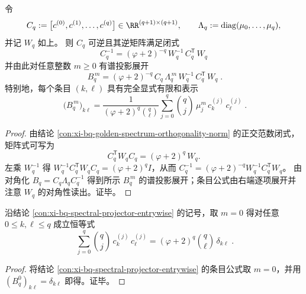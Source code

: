\begin{conclusion}\label{con:xi-bq-spectral-projector-entrywise}
令
\[
C_q:=\bigl[c^{(0)},c^{(1)},\dots,c^{(q)}\bigr]\in\RR^{(q+1)\times(q+1)},
\qquad
\Lambda_q:=\mathrm{diag}(\mu_0,\dots,\mu_q),
\]
并记 \(W_q\) 如上。
则 \(C_q\) 可逆且其逆矩阵满足闭式
\[
\boxed{\;
C_q^{-1}=(\varphi+2)^{-q}\,W_q^{-1}\,C_q^{\mathsf T}\,W_q\;}
\]
并由此对任意整数 \(m\ge 0\) 有谱投影展开
\[
\boxed{\;
B_q^{\,m}
=(\varphi+2)^{-q}\,C_q\,\Lambda_q^{\,m}\,W_q^{-1}\,C_q^{\mathsf T}\,W_q\; } .
\]
特别地，每个条目 \((k,\ell)\) 具有完全显式有限和表示
\[
\boxed{\;
\bigl(B_q^{\,m}\bigr)_{k\ell}
=\frac{1}{(\varphi+2)^{q}\binom{q}{\ell}}
\sum_{j=0}^{q}\binom{q}{j}\,\mu_j^{m}\,c^{(j)}_{k}\,c^{(j)}_{\ell}\; } .
\]
\end{conclusion}
\begin{proof}
由结论 \ref{con:xi-bq-golden-spectrum-orthogonality-norm} 的正交范数闭式，矩阵式可写为
\[
C_q^{\mathsf T}W_qC_q=(\varphi+2)^q\,W_q.
\]
左乘 \(W_q^{-1}\) 得 \(W_q^{-1}C_q^{\mathsf T}W_qC_q=(\varphi+2)^q I\)，从而
\(
C_q^{-1}=(\varphi+2)^{-q}W_q^{-1}C_q^{\mathsf T}W_q
\)。
由对角化 \(B_q=C_q\Lambda_qC_q^{-1}\) 得到所示 \(B_q^{\,m}\) 的谱投影展开；条目公式由右端逐项展开并注意 \(W_q\) 的对角性读出。证毕。
\end{proof}

\begin{conclusion}\label{con:xi-bq-resolution-identity}
沿结论 \ref{con:xi-bq-spectral-projector-entrywise} 的记号，取 \(m=0\) 得对任意 \(0\le k,\ell\le q\) 成立恒等式
\[
\boxed{\;
\sum_{j=0}^{q}\binom{q}{j}\,c^{(j)}_{k}\,c^{(j)}_{\ell}
=(\varphi+2)^{q}\binom{q}{\ell}\,\delta_{k\ell}\; } .
\]
\end{conclusion}
\begin{proof}
将结论 \ref{con:xi-bq-spectral-projector-entrywise} 的条目公式取 \(m=0\)，并用 \((B_q^0)_{k\ell}=\delta_{k\ell}\) 即得。证毕。
\end{proof}

